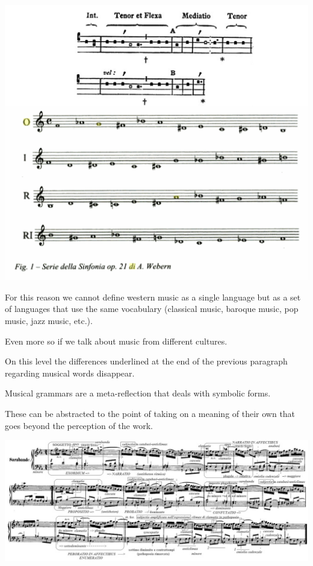 \begin{center}
\includegraphics[scale=0.7]{../img/greg.png}
\end{center}

For this reason we cannot define western music as a single language but as a set of languages \hspace{0pt}\hspace{0pt}that use the same vocabulary (classical music, baroque music, pop music, jazz music, etc.).

Even more so if we talk about music from different cultures.

On this level the differences underlined at the end of the previous paragraph regarding musical words disappear.

Musical grammars are a meta-reflection that deals with symbolic forms.

These can be abstracted to the point of taking on a meaning of their own that goes beyond the perception of the work.

\begin{center}
\includegraphics[scale=1.1]{../img/analisische.png}
\end{center}

